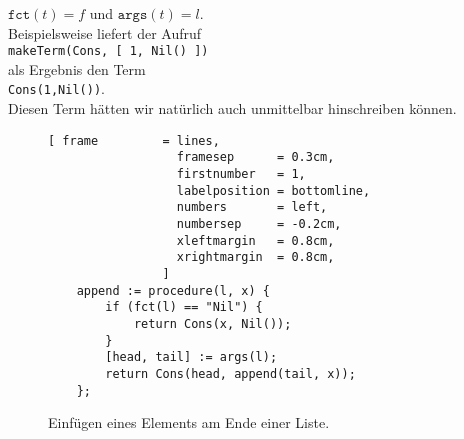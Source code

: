 \begin{enumerate}
      $\mathtt{fct}(t) = f$  \quad und \quad $\mathtt{args}(t) = l$.
      \\[0.2cm]
      Beispielsweise liefert der Aufruf
      \\[0.2cm]
      \hspace*{1.3cm}
      \texttt{makeTerm(Cons, [ 1, Nil() ])}
      \\[0.2cm]
      als Ergebnis den Term
      \\[0.2cm]
      \hspace*{1.3cm}
      \texttt{Cons(1,Nil())}.
      \\[0.2cm]
      Diesen Term h\"{a}tten wir nat\"{u}rlich auch unmittelbar hinschreiben k\"{o}nnen.
\end{enumerate}

\begin{figure}[!ht]
\centering
\begin{Verbatim}[ frame         = lines, 
                  framesep      = 0.3cm, 
                  firstnumber   = 1,
                  labelposition = bottomline,
                  numbers       = left,
                  numbersep     = -0.2cm,
                  xleftmargin   = 0.8cm,
                  xrightmargin  = 0.8cm,
                ]
    append := procedure(l, x) {
        if (fct(l) == "Nil") {
            return Cons(x, Nil());
        }
        [head, tail] := args(l);
        return Cons(head, append(tail, x));
    };
\end{Verbatim}
\vspace*{-0.3cm}
\caption{Einf\"{u}gen eines Elements am Ende einer Liste.}
\label{fig:append.stlx}
\end{figure}


